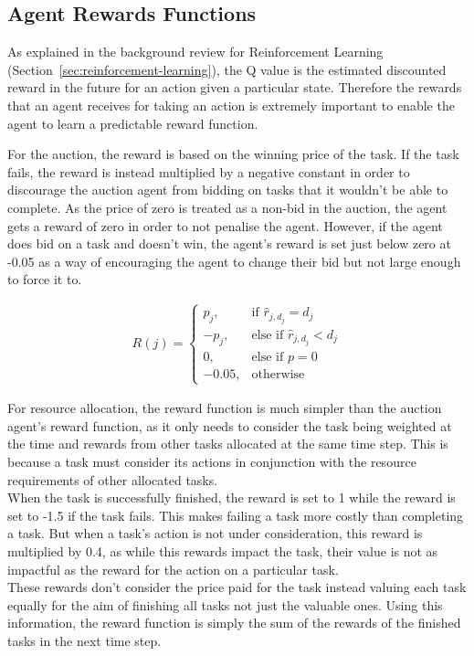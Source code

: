 \subsection{Agent Rewards Functions}
\label{subsec:agent-rewards-functions}
As explained in the background review for Reinforcement Learning (Section~\ref{sec:reinforcement-learning}),
the Q value is the estimated discounted reward in the future for an action given a particular state. Therefore the
rewards that an agent receives for taking an action is extremely important to enable the agent to learn a predictable
reward function.

For the auction, the reward is based on the winning price of the task. If the
task fails, the reward is instead multiplied by a negative constant in order to discourage the auction agent from
bidding on tasks that it wouldn't be able to complete. As the price of zero is treated as a non-bid in the auction, the
agent gets a reward of zero in order to not penalise the agent. However, if the agent does bid on a task and
doesn't win, the agent's reward is set just below zero at -0.05 as a way of encouraging the agent to change their bid
but not large enough to force it to.

\begin{align}
    R(j) =
        \begin{cases}
        p_j,  &\text{if } \hat{r}_{j, d_j} = d_j \\
       -p_j,  &\text{else if } \hat{r}_{j, d_j} < d_j \\
        0,    &\text{else if } p = 0 \\
       -0.05, &\text{otherwise }
        \end{cases}
\end{align}

For resource allocation, the reward function is much simpler than the auction agent's reward function, as it only needs
to consider the task being weighted at the time and rewards from other tasks allocated at the same time step. This is
because a task must consider its actions in conjunction with the resource requirements of other allocated tasks. \\
When the task is successfully finished, the reward is set to 1 while the reward is set to -1.5 if the task fails. This
makes failing a task more costly than completing a task. But when a task's action is not under consideration, this
reward is multiplied by 0.4, as while this rewards impact the task, their value is not as impactful as the reward for
the action on a particular task. \\
These rewards don't consider the price paid for the task instead valuing each task equally for the aim of finishing
all tasks not just the valuable ones. Using this information, the reward function is simply the sum of the rewards of
the finished tasks in the next time step.

